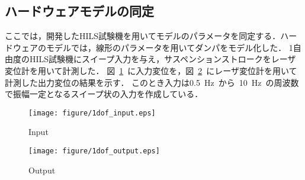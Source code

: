 \documentclass[a4paper,12pt]{article_vdlab_sotsuron}
\begin{document}
\newpage
\subsection{ハードウェアモデルの同定}
ここでは，開発したHILS試験機を用いてモデルのパラメータを同定する．ハードウェアのモデルでは，線形のパラメータを用いてダンパをモデル化した．
1自由度のHILS試験機にスイープ入力を与え，サスペンションストロークをレーザ変位計を用いて計測した．
図~\ref{fig:1dof_input}~に入力変位を，図~\ref{fig:1dof_output}~にレーザ変位計を用いて計測した出力変位の結果を示す．
このとき入力は0.5~Hz~から~10~Hz~の周波数で振幅一定となるスイープ状の入力を作成している．

\vspace*{12mm}
\begin{figure}[h]
  \begin{center}
    \texttt{[image: figure/1dof\_input.eps]}
    \vspace*{3mm}
    \caption{Input}
    \label{fig:1dof_input}
  \end{center}
\end{figure}

\vspace*{12mm}
 \begin{figure}[h]
  \begin{center}
    \texttt{[image: figure/1dof\_output.eps]}
    \vspace*{3mm}
    \caption{Output}
    \label{fig:1dof_output}
  \end{center}
\end{figure}
\end{document}

